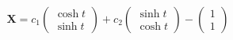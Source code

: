 \documentclass{article}
\begin{document}
\setcounter{subsubsection}{10}
\subsubsection{}

\[\mathbf{X} = c_1 \begin{pmatrix}
    \cosh t \\
    \sinh t
  \end{pmatrix} + c_2 \begin{pmatrix}
    \sinh t \\
    \cosh t
  \end{pmatrix} - \begin{pmatrix}
    1 \\
    1
  \end{pmatrix}\]

\setcounter{subsubsection}{12}
\subsubsection{}
\end{document}
